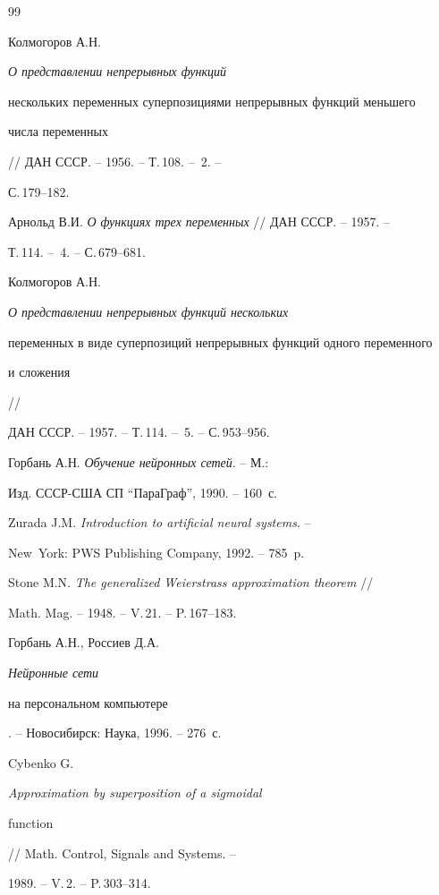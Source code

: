 \begin{thebibliography}{99}







Колмогоров А.Н. {\em О представлении непрерывных функций


нескольких переменных суперпозициями непрерывных функций меньшего


числа переменных} // ДАН СССР. -- 1956. -- Т.\,108. -- \No\,2. --


С.\,179--182.




Арнольд В.И. {\em О функциях трех переменных} // ДАН СССР. -- 1957. --


Т.\,114. -- \No\,4. -- С.\,679--681.




Колмогоров А.Н. {\em О представлении непрерывных функций нескольких


переменных в виде суперпозиций непрерывных функций одного переменного


и сложения} //


ДАН СССР. -- 1957. -- Т.\,114. -- \No\,5. -- С.\,953--956.




Горбань А.Н. {\em Обучение нейронных сетей}. -- М.:


Изд. СССР-США СП ``ПараГраф'', 1990. -- 160~с.




Zurada J.M. {\em Introduction to artificial neural systems}. --


New~York: PWS Publishing Company, 1992. -- 785~p.




Stone M.N. {\em The generalized Weierstrass approximation theorem} //


Math. Mag. -- 1948. -- V.\,21. -- P.\,167--183.




Горбань А.Н., Россиев Д.А. {\em Нейронные сети


на персональном компьютере}. -- Новосибирск: Наука, 1996. -- 276~с.




Cybenko G. {\em Approximation by superposition of a sigmoidal


function} // Math. Control, Signals and Systems. --


1989. -- V.\,2. -- P.\,303--314.



\end{thebibliography}
